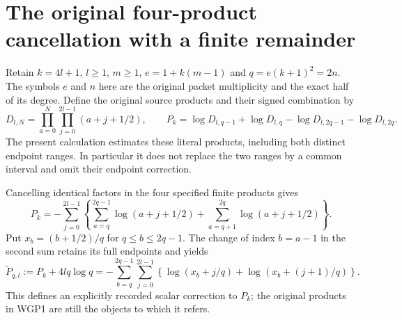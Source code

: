 \documentclass[11pt,a4paper]{article}
\begin{document}

\clearpage

\section{The original four-product cancellation with a finite remainder}
\label{sec:WGP}

Retain $k=4l+1$, $l\ge1$, $m\ge1$, $e=1+k(m-1)$ and
$q=e(k+1)^2=2n$. The symbols $e$ and $n$ here are the original
packet multiplicity and the exact half of its degree. Define the original
source products and their signed combination by
\[
 D_{l,N}=\prod_{a=0}^{N}\prod_{j=0}^{2l-1}(a+j+1/2),\qquad
 P_k=\log D_{l,q-1}+\log D_{l,q}
       -\log D_{l,2q-1}-\log D_{l,2q}.
 \tag{WGP1}
\]
The present calculation estimates these literal products, including both
distinct endpoint ranges. In particular it does not replace the two ranges
by a common interval and omit their endpoint correction.

Cancelling identical factors in the four specified finite products gives
\[
 P_k=-\sum_{j=0}^{2l-1}\left\{
 \sum_{a=q}^{2q-1}\log(a+j+1/2)
 +\sum_{a=q+1}^{2q}\log(a+j+1/2)\right\}.
 \tag{WGP2}
\]
Put $x_b=(b+1/2)/q$ for $q\le b\le2q-1$. The change of index
$b=a-1$ in the second sum retains its full endpoints and yields
\[
 \widetilde P_{q,l}:=P_k+4lq\log q
 =-\sum_{b=q}^{2q-1}\sum_{j=0}^{2l-1}
  \left\{\log(x_b+j/q)+\log(x_b+(j+1)/q)\right\}.
 \tag{WGP3}
\]
This defines an explicitly recorded scalar correction to $P_k$; the
original products in WGP1 are still the objects to which it refers.
\end{document}
